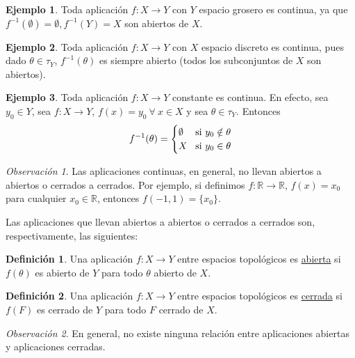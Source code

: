 \documentclass[12pt]{report}
\theoremstyle{definition}
\newtheorem{definition}{Definición}[chapter]
\theoremstyle{definition}
\newtheorem{example}{Ejemplo}[chapter]
\theoremstyle{remark}
\newtheorem*{obs}{Observación} %
\newcommand{\R}{\mathbb R}
\begin{document}
\begin{example}
\label{ex1.18.}
Toda aplicación $f \colon X \to Y$ con $Y$ espacio grosero es continua, ya que $f^{-1}(\emptyset) = \emptyset, f^{-1}(Y) = X$ son abiertos de $X$.
\end{example}

\begin{example}
Toda aplicación $f \colon X \to Y$ con $X$ espacio discreto es continua, pues dado $\theta \in \tau_Y$, $f^{-1}(\theta)$ es siempre abierto (todos los subconjuntos de $X$ son abiertos).
\end{example}

\begin{example}
Toda aplicación $f \colon X \to Y$ constante es continua. En efecto, sea $y_0 \in Y$, sea $f \colon X \to Y$, $f(x) = y_0 \ \forall \ x \in X$ y sea $\theta \in \tau_Y$. Entonces 
\[f^{-1}(\theta) = 
\begin{cases}
\emptyset & \! $si $ y_0 \notin \theta \\
X & \! $si $ y_0 \in \theta
\end{cases}
\]
\end{example}

\vspace{2mm}
\begin{obs}
Las aplicaciones continuas, en general, no llevan abiertos a abiertos o cerrados a cerrados. Por ejemplo, si definimos $f \colon \R \to \R$, $f(x) = x_0$ para cualquier $x_0 \in \R$, entonces $f(-1,1) = \{x_0\}$.
\end{obs}

\vspace{1mm}
Las aplicaciones que llevan abiertos a abiertos o cerrados a cerrados son, respectivamente, las siguientes:

\begin{definition}
Una aplicación $f \colon X \to Y$ entre espacios topológicos es \underline{abierta} si $f(\theta)$ es abierto de $Y$ para todo $\theta$ abierto de $X$.
\end{definition}
\begin{definition}
Una aplicación $f \colon X \to Y$ entre espacios topológicos es \underline{cerrada} si $f(F)$ es cerrado de $Y$ para todo $F$ cerrado de $X$.
\end{definition}
\begin{obs}
En general, no existe ninguna relación entre aplicaciones abiertas y aplicaciones cerradas.
\end{obs}
\end{document}
